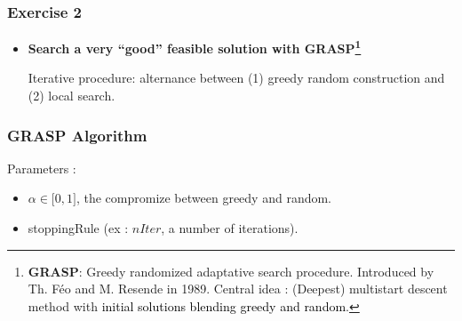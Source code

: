 \documentclass[]{beamer}
\begin{document}
\begin{frame}
  \frametitle{Exercise 2}
\vspace{3mm}

\begin{itemize}

\item \textbf{Search a  very ``good'' feasible solution with GRASP\footnote{\textbf{GRASP}: Greedy randomized adaptative search procedure.  Introduced by Th. Féo and M. Resende in 1989. Central idea : (Deepest)  multistart descent method with \textcolor{black}{initial solutions  blending greedy and random}.}}
\smallskip

Iterative procedure: alternance between  (1) greedy random construction and (2) local search.
\medskip


\medskip

\end{itemize}



\end{frame}


% 
%

\begin{frame}
  \frametitle{GRASP Algorithm}
\vspace{3mm}

 Parameters :

\begin{itemize}
\item   $\alpha \in \mbox{[}0,1\mbox{]}$, the compromize between greedy and random.
\item stoppingRule (ex : $nIter$, a number of  iterations).
\end{itemize}

\vspace{8mm}


\end{frame}
\end{document}
